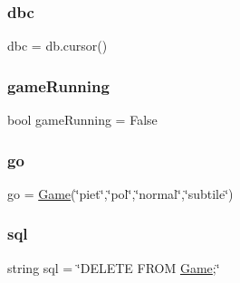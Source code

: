 \hypertarget{namespace____main_____af60395b62cdfc4e22c9bee4739bcc464}{}\label{namespace____main_____af60395b62cdfc4e22c9bee4739bcc464} 
\subsubsection{\texorpdfstring{dbc}{dbc}}
{\footnotesize\ttfamily dbc = db.\+cursor()}

\hypertarget{namespace____main_____aaa52a27abaaf72231a84c99f2bfa4283}{}\label{namespace____main_____aaa52a27abaaf72231a84c99f2bfa4283} 
\subsubsection{\texorpdfstring{game\+Running}{gameRunning}}
{\footnotesize\ttfamily bool game\+Running = False}

\hypertarget{namespace____main_____a1406f37190e825427440bc020919218a}{}\label{namespace____main_____a1406f37190e825427440bc020919218a} 
\subsubsection{\texorpdfstring{go}{go}}
{\footnotesize\ttfamily go = \hyperlink{classgame_1_1game_1_1_game}{Game}(\char`\"{}piet\char`\"{},\char`\"{}pol\char`\"{},\char`\"{}normal\char`\"{},\char`\"{}subtile\char`\"{})}

\hypertarget{namespace____main_____acf77f6f6ad1fd09466587857fd4b2e7e}{}\label{namespace____main_____acf77f6f6ad1fd09466587857fd4b2e7e} 
\subsubsection{\texorpdfstring{sql}{sql}}
{\footnotesize\ttfamily string sql = \char`\"{}D\+E\+L\+E\+TE F\+R\+OM \hyperlink{classgame_1_1game_1_1_game}{Game};\char`\"{}}

\hypertarget{namespace____main_____ae3f5dd704a78b1b22fbf6672452aff3e}{}\label{namespace____main_____ae3f5dd704a78b1b22fbf6672452aff3e} 
